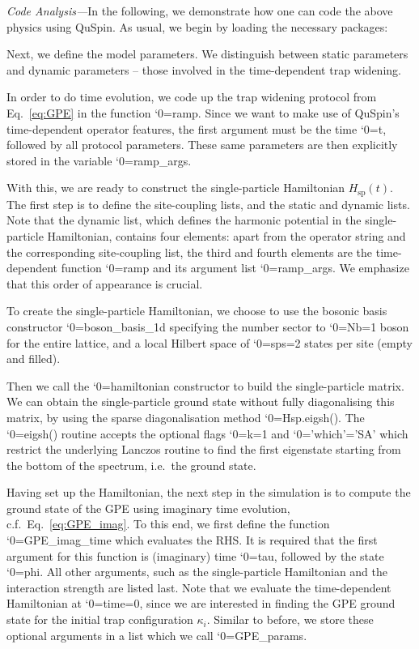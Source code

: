 \documentclass{SciPost}
\newcommand\0{\scalebox{-1}[1]{0}}
\let\svttfamily\ttfamily
\renewcommand\ttfamily{\svttfamily\catcode`0=\active }
\renewcommand\texttt{\bgroup\ttfamily\texttthelp}
\def\texttthelp#1{#1\egroup}
\newcommand{\GPcode}{example8.py}
\begin{document}
\noindent\emph{Code Analysis---}In the following, we demonstrate how one can code the above physics using QuSpin. As usual, we begin by loading the necessary packages:

Next, we define the model parameters. We distinguish between static parameters and dynamic parameters -- those involved in the time-dependent trap widening.

In order to do time evolution, we code up the trap widening protocol from Eq.~\eqref{eq:GPE} in the function \texttt{ramp}. Since we want to make use of QuSpin's time-dependent operator features, the first argument must be the time \texttt{t}, followed by all protocol parameters. These same parameters are then explicitly stored in the variable \texttt{ramp\_args}.

With this, we are ready to construct the single-particle Hamiltonian $H_\mathrm{sp}(t)$. The first step is to define the site-coupling lists, and the static and dynamic lists. Note that the dynamic list, which defines the harmonic potential in the single-particle Hamiltonian, contains four elements: apart from the operator string and the corresponding site-coupling list, the third and fourth elements are the time-dependent function \texttt{ramp} and its argument list \texttt{ramp\_args}. We emphasize that this order of appearance is crucial.

To create the single-particle Hamiltonian, we choose to use the bosonic basis constructor \texttt{boson\_basis\_1d} specifying the number sector to \texttt{Nb=1} boson for the entire lattice, and a local Hilbert space of \texttt{sps=2} states per site (empty and filled). 

Then we call the \texttt{hamiltonian} constructor to build the single-particle matrix. We can obtain the single-particle ground state without fully diagonalising this matrix, by using the sparse diagonalisation method \texttt{Hsp.eigsh()}. The \texttt{eigsh()} routine accepts the optional flags \texttt{k=1} and \texttt{'which'='SA'} which restrict the underlying Lanczos routine to find the first eigenstate starting from the bottom of the spectrum, i.e.~the ground state.	

Having set up the Hamiltonian, the next step in the simulation is to compute the ground state of the GPE using imaginary time evolution, c.f.~Eq.~\eqref{eq:GPE_imag}. To this end, we first define the function \texttt{GPE\_imag\_time} which evaluates the RHS. It is required that the first argument for this function is (imaginary) time \texttt{tau}, followed by the state \texttt{phi}. All other arguments, such as the single-particle Hamiltonian and the interaction strength are listed last. Note that we evaluate the time-dependent Hamiltonian at \texttt{time=0}, since we are interested in finding the GPE ground state for the initial trap configuration $\kappa_i$. Similar to before, we store these optional arguments in a list which we call \texttt{GPE\_params}. 
\end{document}
